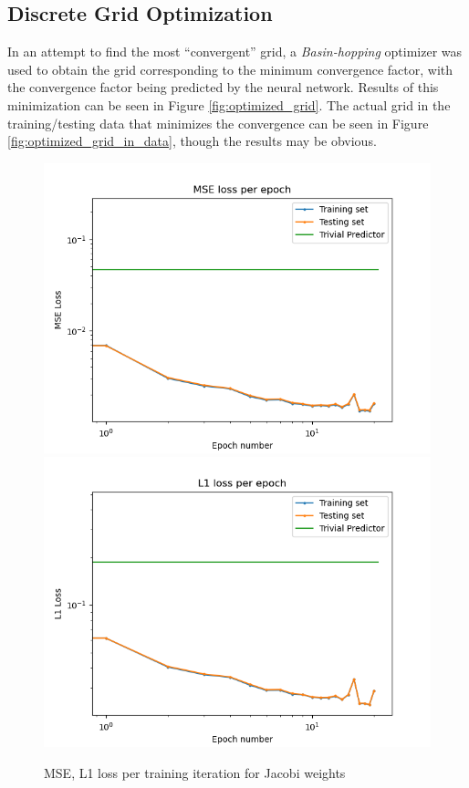 \subsection{Discrete Grid Optimization}

In an attempt to find the most ``convergent'' grid, a \textit{Basin-hopping} optimizer was used to obtain the grid corresponding to the minimum convergence factor, with the convergence factor being predicted by the neural network.  Results of this minimization can be seen in Figure \ref{fig:optimized_grid}.  The actual grid in the training/testing data that minimizes the convergence can be seen in Figure \ref{fig:optimized_grid_in_data}, though the results may be obvious.

\begin{figure}[h]
  \centering
  \includegraphics[scale=0.7]{figures/jacobi-conv/jacobi_mse.png}
  \includegraphics[scale=0.7]{figures/jacobi-conv/jacobi_l1.png}
  \caption{MSE, L1 loss per training iteration for Jacobi weights}
  \label{fig:jacobi_loss}
\end{figure}

